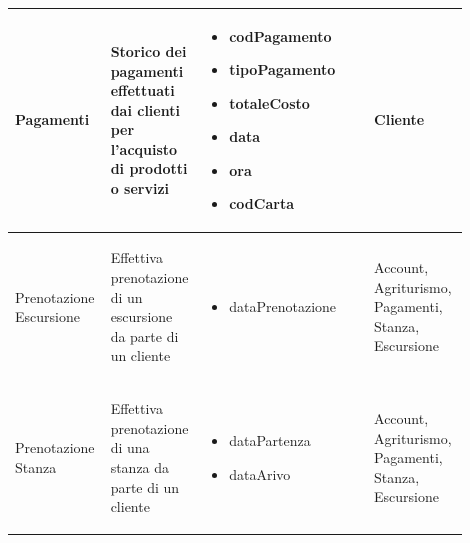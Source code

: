 \documentclass[12pt,a4paper]{article}
\begin{document}
\begin{center}
\begin{longtable}{|p{0.14\linewidth}|p{0.20\linewidth}|p{0.36\linewidth}|p{0.20\linewidth}|}
\hline
Pagamenti				 	& \begin{flushleft}\vspace{-25pt} Storico dei pagamenti effettuati dai clienti per l'acquisto di prodotti o servizi \end{flushleft}
					& \begin{itemize}
						\setlength{\itemindent}{-1em}
						\vspace{-25pt}
						\setlength\itemsep{-0.25em}
						\item codPagamento
						\item tipoPagamento
						\item totaleCosto
						\item data
						\item ora
						\item codCarta
					\end{itemize}
					& \begin{flushleft}\vspace{-25pt} Cliente \end{flushleft} \\ 

\hline
Pre\-no\-ta\-zio\-ne Escursione				 	& \begin{flushleft}\vspace{-25pt} Effettiva prenotazione di un escursione da parte di un cliente \end{flushleft}
					& \begin{itemize}
						\setlength{\itemindent}{-1em}
						\vspace{-25pt}
						\setlength\itemsep{-0.25em}
						\item dataPrenotazione
					\end{itemize}
					& \begin{flushleft}\vspace{-25pt} Account, Agriturismo, Pagamenti, Stanza, Escursione \end{flushleft} \\ 

\hline
Pre\-no\-ta\-zio\-ne Stanza				 	& \begin{flushleft}\vspace{-25pt} Effettiva prenotazione di una stanza da parte di un cliente \end{flushleft}
					& \begin{itemize}
						\setlength{\itemindent}{-1em}
						\vspace{-25pt}
						\setlength\itemsep{-0.25em}
						\item dataPartenza
						\item dataArivo
					\end{itemize}
					& \begin{flushleft}\vspace{-25pt} Account, Agriturismo, Pagamenti, Stanza, Escursione \end{flushleft} \\ 


\end{longtable}
\end{center}
\end{document}
